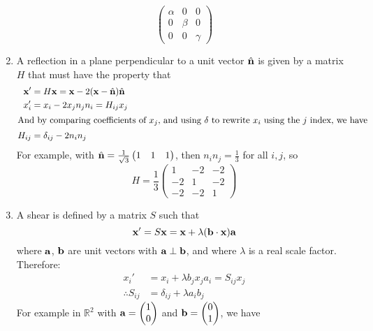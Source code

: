 \begin{example}
\begin{enumerate}
	      \[
		      \begin{pmatrix}
			      \alpha & 0     & 0      \\
			      0      & \beta & 0      \\
			      0      & 0     & \gamma
		      \end{pmatrix}
	      \]
	\item A reflection in a plane perpendicular to a unit vector \(\hat{\vb{n}}\) is given by a matrix \(H\) that must have the property that
	      \begin{align*}
		      \vb x' & = H \vb x = \vb x - 2(\vb x - \hat{\vb{n}}) \hat{\vb{n}} \\
		      x_i'   & = x_i - 2x_j n_j n_i = H_{ij}x_j           \\
		      \intertext{And by comparing coefficients of \(x_j\), and using \(\delta\) to rewrite \(x_i\) using the \(j\) index, we have}
		      H_{ij} & = \delta_{ij} - 2n_i n_j
	      \end{align*}
	      For example, with \(\hat{\vb{n}} = \frac{1}{\sqrt 3}\begin{pmatrix}
		      1 & 1 & 1
	      \end{pmatrix}\), then \(n_i n_j = \frac{1}{3}\) for all \(i, j\), so
	      \[
		      H = \frac{1}{3}\begin{pmatrix}
			      1  & -2 & -2 \\
			      -2 & 1  & -2 \\
			      -2 & -2 & 1
		      \end{pmatrix}
	      \]
	\item A shear is defined by a matrix \(S\) such that
	      \[
		      \vb x' = S\vb x = \vb x + \lambda(\vb b \cdot \vb x)\vb a
	      \]
	      where \(\vb a\), \(\vb b\) are unit vectors with \(\vb a \perp \vb b\), and where \(\lambda\) is a real scale factor.
	      Therefore:
	      \begin{align*}
		      x_i'              & = x_i + \lambda b_j x_j a_i = S_{ij}x_j \\
		      \therefore S_{ij} & = \delta_{ij} + \lambda a_i b_j
	      \end{align*}
	      For example in \(\mathbb R^2\) with \(\vb a = \begin{pmatrix}
		      1 \\ 0
	      \end{pmatrix}\) and \(\vb b = \begin{pmatrix}
		      0 \\ 1
	      \end{pmatrix}\), we have

\end{enumerate}
\end{example}
